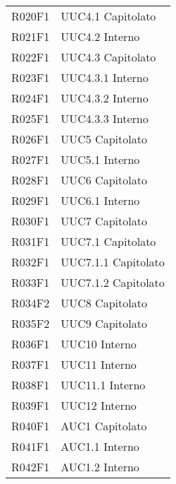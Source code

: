 \documentclass[../analisi-dei-requisiti.tex]{subfiles}
\begin{document}
\begin{center}
\begin{longtable}[H]{ p{3cm} | p{4cm} }
  R020F1                               & UUC4.1 Capitolato             \\
  R021F1                               & UUC4.2 Interno                \\
  R022F1                               & UUC4.3 Capitolato             \\
  R023F1                               & UUC4.3.1 Interno              \\
  R024F1                               & UUC4.3.2 Interno              \\
  R025F1                               & UUC4.3.3 Interno              \\
  R026F1                               & UUC5 Capitolato               \\
  R027F1                               & UUC5.1 Interno                \\
  R028F1                               & UUC6 Capitolato               \\
  R029F1                               & UUC6.1 Interno                \\
  R030F1                               & UUC7 Capitolato               \\
  R031F1                               & UUC7.1 Capitolato             \\
  R032F1                               & UUC7.1.1 Capitolato           \\
  R033F1                               & UUC7.1.2 Capitolato           \\
  R034F2                               & UUC8 Capitolato               \\
  R035F2                               & UUC9 Capitolato               \\
  R036F1                               & UUC10 Interno                 \\
  R037F1                               & UUC11 Interno                 \\
  R038F1                               & UUC11.1 Interno               \\
  R039F1                               & UUC12 Interno                 \\
  R040F1                               & AUC1 Capitolato               \\
  R041F1                               & AUC1.1 Interno                \\
  R042F1                               & AUC1.2 Interno                \\

\end{longtable}
\end{center}
\end{document}
